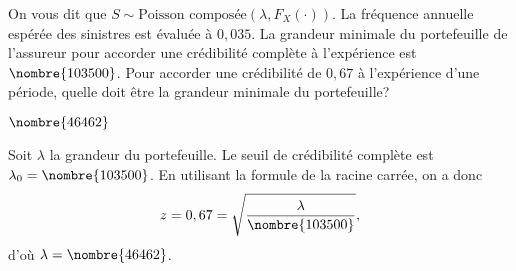 \begin{exercice}
  On vous dit que $S \sim \text{Poisson composée}(\lambda,
  F_X(\cdot))$. La fréquence annuelle espérée des sinistres est
  évaluée à $0,035$. La grandeur minimale du portefeuille de
  l'assureur pour accorder une crédibilité complète à l'expérience est
  $\nombre{103500}$. Pour accorder une crédibilité de $0,67$ à
  l'expérience d'une période, quelle doit être la grandeur minimale du
  portefeuille?
  \begin{rep}
    $\nombre{46462}$
  \end{rep}
  \begin{sol}
    Soit $\lambda$ la grandeur du portefeuille. Le seuil de
    crédibilité complète est $\lambda_0 = \nombre{103500}$. En
    utilisant la formule de la racine carrée, on a donc
    \begin{displaymath}
      z = 0,67 = \sqrt{\frac{\lambda}{\nombre{103500}}},
    \end{displaymath}
    d'où $\lambda = \nombre{46462}$.
  \end{sol}
\end{exercice}

